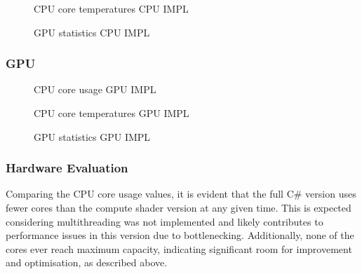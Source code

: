 \documentclass[a4paper, 12pt]{article}
\newcommand{\wideimage}[2][]{%
  \makebox[\textwidth][c]{\texttt{[image: \#2]}}%
}
\begin{document}
    \begin{figure}[H]
        \begin{center}
            \wideimage[width=0.75\textwidth, height=0.41\textheight]{afterCPUTempCPU.png}
            \caption{CPU core temperatures CPU IMPL}
        \end{center}
    \end{figure}

    \begin{figure}[H]
        \begin{center}
            \wideimage[width=0.75\textwidth, height=0.41\textheight]{afterGPUCPU.png}
            \caption{GPU statistics CPU IMPL}
        \end{center}
    \end{figure}

    \subsubsection{GPU}

    \begin{figure}[H]
        \begin{center}
            \wideimage[width=1.1\textwidth]{afterCPUUsageGPU.png}
            \caption{CPU core usage GPU IMPL}
        \end{center}
    \end{figure}

    \begin{figure}[H]
        \begin{center}
            \wideimage[width=0.75\textwidth, height=0.41\textheight]{afterCPUTempGPU.png}
            \caption{CPU core temperatures GPU IMPL}
        \end{center}
    \end{figure}

    \begin{figure}[H]
        \begin{center}
            \wideimage[width=0.75\textwidth, height=0.41\textheight]{afterGPUGPU.png}
            \caption{GPU statistics GPU IMPL}
        \end{center}
    \end{figure}

    \subsubsection{Hardware Evaluation}

    Comparing the CPU core usage values, it is evident that the full C\# version uses fewer cores than the compute shader version at any given time. This is expected considering multithreading was not implemented and likely contributes to performance issues in this version due to bottlenecking. Additionally, none of the cores ever reach maximum capacity, indicating significant room for improvement and optimisation, as described above.
    
\end{document}

